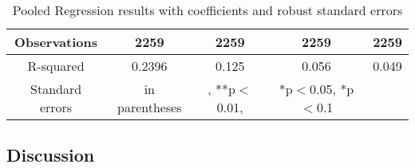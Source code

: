 \begin{table}[h!]
\begin{tabular}{|ccccc|}
Observations & 2259 & 2259 & 2259 & 2259 \\
\hline
R-squared &0.2396 & 0.125 & 0.056 & 0.049 \\
\hline
\footnotesize Standard errors& \footnotesize in parentheses&, \footnotesize***p$<$0.01, &\footnotesize **p$<$0.05, *p$<$0.1\\
\end{tabular}
\caption{Pooled Regression results with coefficients and robust standard errors}
\label{Pooled Regression results with coefficients and robust standard errors}
\end{table}



\subsection{Discussion}

